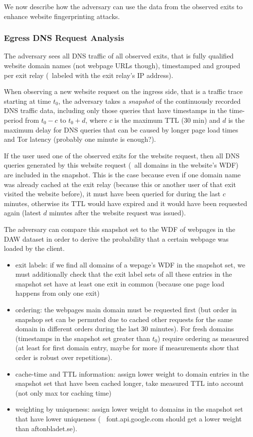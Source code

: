%
We now describe how the adversary can use the data from the observed
exits to enhance website fingerprinting attacks.


\subsubsection{Egress DNS Request Analysis}

The adversary sees all DNS traffic of all observed exits, that is fully
qualified website domain names (not webpage URLs though), timestamped
and grouped per exit relay (\eg~labeled with the exit relay's IP
address).

When observing a new website request on the ingress side, that is a
traffic trace starting at time $t_0$, the adversary takes a \emph{snapshot}
of the continuously recorded DNS traffic data, including only those queries
that have timestamps in the time-period from $t_0 - c$ to $t_0 + d$,
where $c$ is the maximum TTL (30 min) and $d$ is the maximum delay
for DNS queries that can be caused by longer page load times and Tor
latency (probably one minute is enough?).

If the user used one of the observed exits for the website request, then
all DNS queries generated by this website request (\ie~all domains in
the website's WDF) are included in the snapshot. This is the case
because even if one domain name was already cached at the exit relay
(because this or another user of that exit visited the website before),
it must have been queried for during the last $c$ minutes, otherwise its
TTL would have expired and it would have been requested again (latest
$d$ minutes after the website request was issued).

The adversary can compare this snapshot set to the WDF of webpages in
the DAW dataset in order to derive the probability that a certain
webpage was loaded by the client.

\begin{itemize}
  \item exit labels: if we find all domains of a wepage's WDF in the
		  snapshot set, we must additionally check that the exit label
		  sets of all these entries in the snapshot set have at least
		  one exit in common (because one page load happens from only
		  one exit)
  \item ordering: the webpages main domain must be requested first (but
		  order in snapshop set can be permuted due to cached other
		  requests for the same domain in different orders during the
		  last 30 minutes). For fresh domains (timestamps in the
		  snapshot set greater than $t_0$) require ordering as measured
		  (at least for first domain entry, maybe for more if
		  measurements show that order is robust over repetitions).
  \item cache-time and TTL information: assign lower weight to domain
		  entries in the snapshot set that have been cached longer, take
		  measured TTL into account (not only max tor caching time)
  \item weighting by uniqueness: assign lower weight to domains in the
		  snapshot set that have lower uniqueness (\eg~
		  font.api.google.com should get a lower weight than
		  aftonbladet.se).
\end{itemize}

